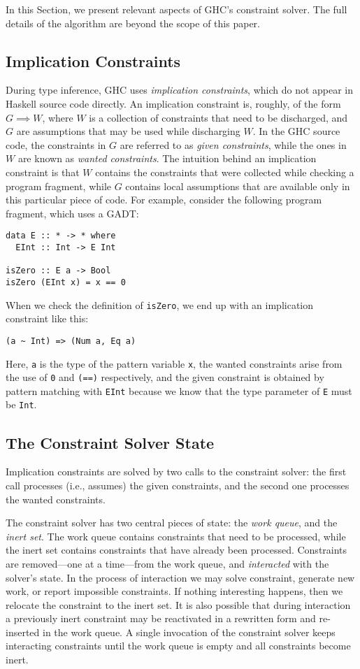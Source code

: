 \documentclass{sigplanconf}
\begin{document}
In this Section, we present relevant aspects of GHC's constraint solver.
The full details of the algorithm \cite{outsidein} are beyond the scope
of this paper.

\subsection{Implication Constraints}
During type inference, GHC uses {\em implication constraints}, which do
not appear in Haskell source code directly. An implication constraint is,
roughly, of the form $G\implies W$, where $W$ is a collection
of constraints that need to be discharged, and $G$ are assumptions that
may be used while discharging $W$.  In the GHC source code, the constraints
in $G$ are referred to as {\em given constraints}, while the ones in $W$ are
known as {\em wanted constraints}.  The intuition behind an implication
constraint is that $W$ contains the constraints that were collected
while checking a program fragment, while $G$ contains local assumptions
that are available only in this particular piece of code.  For example,
consider the following program fragment, which uses a GADT:
\begin{Verbatim}
data E :: * -> * where
  EInt :: Int -> E Int

isZero :: E a -> Bool
isZero (EInt x) = x == 0
\end{Verbatim}
When we check the definition of \Verb"isZero", we end up with an implication
constraint like this:
\begin{Verbatim}
(a ~ Int) => (Num a, Eq a)
\end{Verbatim}
Here, \Verb"a" is the type of the pattern variable \Verb"x", the wanted
constraints arise from the use of \Verb"0" and \Verb"(==)" respectively,
and the given constraint is obtained by pattern matching with \Verb"EInt"
because we know that the type parameter of \Verb"E" must be \Verb"Int".


\subsection{The Constraint Solver State}
Implication constraints are solved by two calls to the constraint solver:
the first call processes (i.e., assumes) the given constraints, and the
second one processes the wanted constraints.

The constraint solver has two central pieces of state: the {\em work queue},
and the {\em inert set}.  The work queue contains constraints that need to be
processed, while the inert set contains constraints that have already
been processed.  Constraints are removed---one at a time---from the work queue,
and {\em interacted} with the solver's state.  In the process of interaction
we may solve constraint, generate new work, or report impossible constraints.
If nothing interesting happens, then we relocate the constraint to the
inert set.  It is also possible that during interaction a previously
inert constraint may be reactivated in a rewritten form and re-inserted
in the work queue.  A single invocation of the constraint solver keeps
interacting constraints until the work queue is empty and all constraints
become inert.
\end{document}
